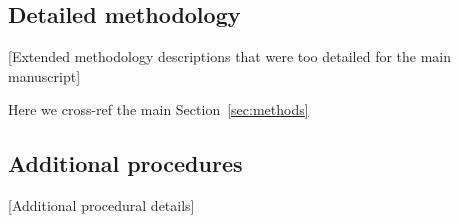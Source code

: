 
\subsection{Detailed methodology} \label{subsec:supp-detailed-methods}

[Extended methodology descriptions that were too detailed for the main manuscript]

Here we cross-ref the main Section~\ref{sec:methods}

\subsection{Additional procedures}

[Additional procedural details]

